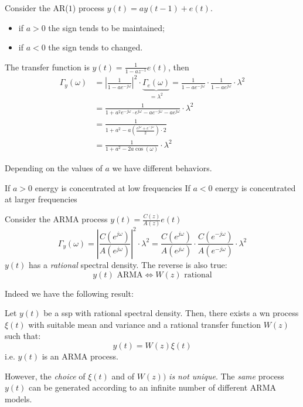 \begin{example}
Consider the AR($1$) process $y(t)=ay(t-1)+e(t)$.
\begin{itemize}
	\item if $a>0$ the sign tends to be maintained;
	\item if $a<0$ the sign tends to changed.
\end{itemize}
The transfer function is $y(t)=\frac{1}{1-az^{-1} }e(t)$, then
\begin{align*}
	\Gamma _{y}(\omega )&=\left|\frac{1}{1-ae^{-j\omega } }\right|^2 \cdot\underbrace{\Gamma _{e}(\omega )}_{=\lambda^2 } = \frac{1}{1-ae^{-j\omega}}\cdot\frac{1}{1-ae^{j\omega}} \cdot\lambda^2\\
	&=\frac{1}{1+a^2 e^{-j\omega }\cdot e^{j\omega }-ae^{-j\omega}-ae^{j\omega}} \cdot \lambda^2\\
	&=\frac{1}{1+a^2 -a\left( \frac{e^{j\omega}+e^{-j\omega}}{2} \right)\cdot 2}\\
	&=\frac{1}{1+a^2-2a\cos (\omega)} \cdot\lambda^2
\end{align*}
\end{example}
Depending on the values of $a$ we have different behaviors.

If $a>0$ energy is concentrated at low frequencies
If $a<0$ energy is concentrated at larger frequencies

\begin{example}
Consider the ARMA process $y(t)=\frac{C(z)}{A(z)}e(t)$
\[
	\Gamma _{y}(\omega )=\left|\frac{C(e^{j\omega})}{A(e^{j\omega})}\right|^2 \cdot\lambda^2 =\frac{C(e^{j\omega})}{A(e^{j\omega} )} \cdot \frac{C(e^{-j\omega})}{A(e^{-j\omega} )}\cdot\lambda^2 
\]
$y(t)$ has a \emph{rational} spectral density. The reverse is also true:
\[
	y(t) \text{ ARMA} \iff W(z) \text{ rational}
\]
\end{example}
Indeed we have the following result:
\begin{theorem}
	Let $y(t)$ be a \gls{ssp} with rational spectral density.
	Then, there exists a \gls{wn} process $\xi(t)$ with suitable mean and variance and a rational transfer function $W(z)$ such that:
	\[
		y(t)=W(z)\xi(t)
	\]
	i.e. $y(t)$ is an ARMA process.
\end{theorem}

However, the \emph{choice} of $\xi(t)$ and of $W(z))$ \emph{is not unique}.
The \emph{same} process $y(t)$ can be generated according to an infinite number of different ARMA models.

